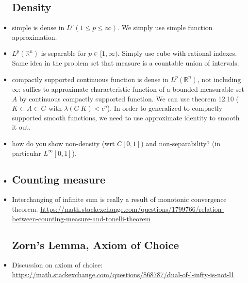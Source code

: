 \documentclass{article}
\theoremstyle{remark}
\begin{document}
\begin{itemize}
\subsection*{Density}
\item simple is dense in $L^p (1\leq p\leq \infty)$. We simply use simple function approximation.
\item $L^p(\mathbb{R}^n)$ is separable for $p\in [1,\infty)$. Simply use cube with rational indexes. Same idea in the problem set that measure is a countable union of intervals.
\item compactly supported continuous function is dense in $L^p(\mathbb{R}^n)$, not including $\infty$: suffies to approximate characteristic function of a bounded measurable set $A$ by continuous compactly supported function. We can use theorem 12.10 ($K\subset A\subset G$ with $\lambda(G\ K)<\epsilon^p$). In order to generalized to compactly supported smooth functions, we need to use approximate identity to smooth it out.
\item how do you show non-density (wrt $C[0,1]$) and non-separability? (in particular $L^\infty[0,1]$).
\item 






\subsection*{Counting measure}
\item Interchanging of infinite sum is really a result of monotonic convergence theorem. \url{https://math.stackexchange.com/questions/1799766/relation-between-counting-measure-and-tonelli-theorem}

\subsection*{Zorn's Lemma, Axiom of Choice}
\item Discussion on axiom of choice: \url{https://math.stackexchange.com/questions/868787/dual-of-l-infty-is-not-l1}


\end{itemize}
\end{document}
